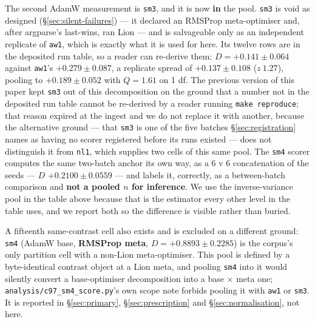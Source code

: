 \documentclass[10pt,letterpaper]{article}
\newcommand{\Dstat}{D}                         %
\newcommand{\arm}[1]{\texttt{#1}}
\begin{document}
The second AdamW measurement is \arm{sm3}, and it is now \textbf{in} the pool. \arm{sm3} is void
as designed (\S\ref{sec:silent-failures}) --- it declared an RMSProp meta-optimiser and, after
argparse's last-wins, ran Lion --- and is salvageable only as an independent replicate of
\arm{aw1}, which is exactly what it is used for here. Its twelve rows are in the deposited run
table, so a reader can re-derive them: $\Dstat = +0.141 \pm 0.064$ against \arm{aw1}'s
$+0.279 \pm 0.087$, a replicate spread of $+0.137 \pm 0.108$ ($z\ 1.27$), pooling to
$+0.189 \pm 0.052$ with $Q = 1.61$ on 1 df. The previous version of this paper kept \arm{sm3} out of this
decomposition on the ground that a number not in the deposited run table cannot be re-derived by
a reader running \texttt{make reproduce}; that reason expired at the ingest and we do not replace
it with another, because the alternative ground --- that \arm{sm3} is one of the five batches
\S\ref{sec:registration} names as having no scorer registered before its runs existed --- does
not distinguish it from \arm{nl1}, which supplies two cells of this same pool. The \arm{sm4}
scorer computes the same two-batch anchor its own way, as a 6 v 6 concatenation of the seeds ---
$\Dstat$ $+0.2100 \pm 0.0559$ --- and labels it, correctly, as a between-batch comparison and
\textbf{not a pooled $n$ for inference}. We use the inverse-variance pool in the table above
because that is the estimator every other level in the table uses, and we report both so the
difference is visible rather than buried.

A fifteenth same-contrast cell also exists and is excluded on a different ground: \arm{sm4}
(AdamW base, \textbf{RMSProp meta}, $\Dstat = +0.8893 \pm 0.2285$) is the corpus's only partition
cell with a non-Lion meta-optimiser. This pool is defined by a byte-identical contrast object at
a Lion meta, and pooling \arm{sm4} into it would silently convert a base-optimiser decomposition
into a base $\times$ meta one; \texttt{analysis/c97\_sm4\_score.py}'s own scope note forbids
pooling it with \arm{aw1} or \arm{sm3}. It is reported in \S\ref{sec:primary},
\S\ref{sec:prescription} and \S\ref{sec:normalisation}, not here.
\end{document}
